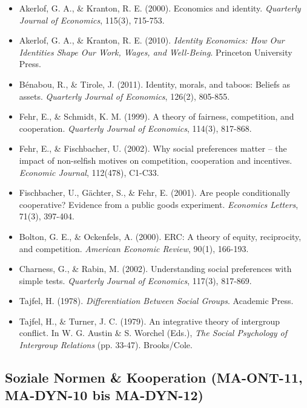 \begin{itemize}[leftmargin=*]
    \item Akerlof, G. A., \& Kranton, R. E. (2000). Economics and identity. \textit{Quarterly Journal of Economics}, 115(3), 715-753.
    \item Akerlof, G. A., \& Kranton, R. E. (2010). \textit{Identity Economics: How Our Identities Shape Our Work, Wages, and Well-Being}. Princeton University Press.
    \item Bénabou, R., \& Tirole, J. (2011). Identity, morals, and taboos: Beliefs as assets. \textit{Quarterly Journal of Economics}, 126(2), 805-855.
    \item Fehr, E., \& Schmidt, K. M. (1999). A theory of fairness, competition, and cooperation. \textit{Quarterly Journal of Economics}, 114(3), 817-868.
    \item Fehr, E., \& Fischbacher, U. (2002). Why social preferences matter -- the impact of non-selfish motives on competition, cooperation and incentives. \textit{Economic Journal}, 112(478), C1-C33.
    \item Fischbacher, U., Gächter, S., \& Fehr, E. (2001). Are people conditionally cooperative? Evidence from a public goods experiment. \textit{Economics Letters}, 71(3), 397-404.
    \item Bolton, G. E., \& Ockenfels, A. (2000). ERC: A theory of equity, reciprocity, and competition. \textit{American Economic Review}, 90(1), 166-193.
    \item Charness, G., \& Rabin, M. (2002). Understanding social preferences with simple tests. \textit{Quarterly Journal of Economics}, 117(3), 817-869.
    \item Tajfel, H. (1978). \textit{Differentiation Between Social Groups}. Academic Press.
    \item Tajfel, H., \& Turner, J. C. (1979). An integrative theory of intergroup conflict. In W. G. Austin \& S. Worchel (Eds.), \textit{The Social Psychology of Intergroup Relations} (pp. 33-47). Brooks/Cole.
\end{itemize}

\subsection*{Soziale Normen \& Kooperation (MA-ONT-11, MA-DYN-10 bis MA-DYN-12)}

